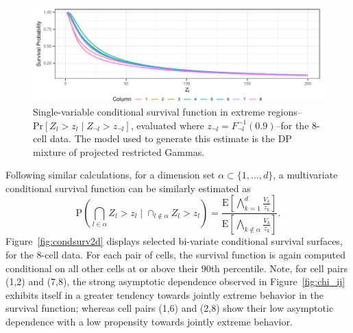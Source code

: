 \begin{figure}[h]
  \label{fig:condsurv1d}
  \includegraphics{./images/condsurv_1d}
  \caption{
    Single-variable conditional survival function in extreme
    regions--$\text{Pr}[Z_l > z_l\mid Z_{\neg l} > z_{\neg l}]$,
    evaluated where $z_{\neg l} = F_{\neg l}^{-1}(0.9)$--for the 8-cell data.  The model used to
    generate this estimate is the DP mixture of projected restricted Gammas.
    }
\end{figure}

Following similar calculations, for a dimension set $\alpha \subset \{1,\ldots, d\}$, a multivariate
  conditional survival function can be similarly estimated as
  \begin{equation}
    \label{eqn:condsurv2df}
    \text{P}\left(\bigcap_{l \in \alpha} Z_l > z_l \mid \cap_{l\not\in\alpha} Z_l > z_l\right) =
      \frac{\text{E}\left[\bigwedge_{k = 1}^d \frac{V_k}{z_k}\right]}{\text{E}\left[\bigwedge_{k \not\in\alpha}\frac{V_k}{z_k}\right]}.
  \end{equation}
  Figure~\ref{fig:condsurv2d} displays selected bi-variate conditional survival surfaces, for the 8-cell
  data.  For each pair of cells, the survival function is again computed conditional on  all other cells
  at or above their $90$th percentile.  Note, for cell pairs (1,2) and (7,8), the strong asymptotic dependence
  observed in Figure~\ref{fig:chi_ij} exhibits itself in a greater tendency towards jointly extreme
  behavior in the survival function; whereas cell pairs (1,6) and (2,8) show their low asymptotic
  dependence with a low propensity towards jointly extreme behavior.

